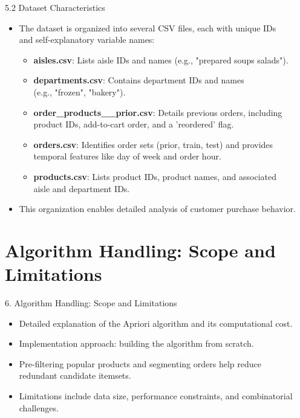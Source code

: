 \documentclass{beamer}
\begin{document}
\begin{frame}{5.2 Dataset Characteristics}
    \begin{itemize}
        \item The dataset is organized into several CSV files, each with unique IDs \\
              and self-explanatory variable names:
        \begin{itemize}
            \item \textbf{aisles.csv}: Lists aisle IDs and names (e.g., "prepared soups salads").
            \item \textbf{departments.csv}: Contains department IDs and names \\
                  (e.g., "frozen", "bakery").
            \item \textbf{order\_products\_\_prior.csv}: Details previous orders, including\\
                  product IDs, add-to-cart order, and a 'reordered' flag.
            \item \textbf{orders.csv}: Identifies order sets (prior, train, test) and provides\\
                  temporal features like day of week and order hour.
            \item \textbf{products.csv}: Lists product IDs, product names, and associated \\
                  aisle and department IDs.
        \end{itemize}
        \item This organization enables detailed analysis of customer purchase behavior.
    \end{itemize}
\end{frame}

\section{Algorithm Handling: Scope and Limitations}

\begin{frame}{6. Algorithm Handling: Scope and Limitations}
    \begin{itemize}
        \item Detailed explanation of the Apriori algorithm and its computational cost.
        \item Implementation approach: building the algorithm from scratch.
        \item Pre-filtering popular products and segmenting orders help reduce \\
              redundant candidate itemsets.
        \item Limitations include data size, performance constraints, and combinatorial\\
              challenges.
    \end{itemize}
\end{frame}
\end{document}
